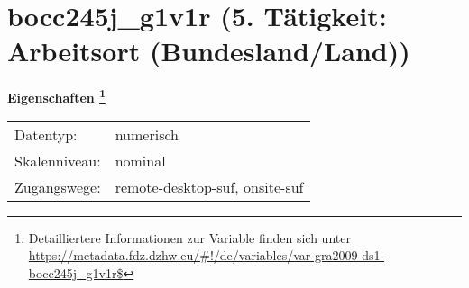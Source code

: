 
    \setcounter{footnote}{0}

    \vspace*{-1.8cm}
	\section{bocc245j\_g1v1r (5. Tätigkeit: Arbeitsort (Bundesland/Land))}
	\label{section:bocc245j_g1v1r}



    \vspace*{0.5cm}
    \noindent\textbf{Eigenschaften
	\footnote{Detailliertere Informationen zur Variable finden sich unter
		\url{https://metadata.fdz.dzhw.eu/\#!/de/variables/var-gra2009-ds1-bocc245j_g1v1r$}}}\\
	\begin{tabularx}{\hsize}{@{}lX}
	Datentyp: & numerisch \\
	Skalenniveau: & nominal \\
	Zugangswege: &
	  remote-desktop-suf, 
	  onsite-suf
 \\
    \end{tabularx}



